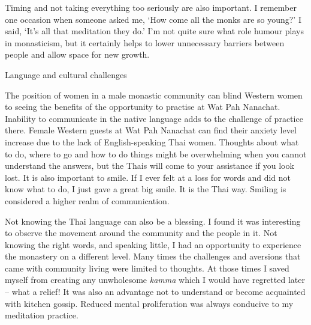Timing and not taking everything too seriously are also important. I
remember one occasion when someone asked me, `How come all the monks are
so young?' I said, `It's all that meditation they do.' I'm not quite
sure what role humour plays in monasticism, but it certainly helps to
lower unnecessary barriers between people and allow space for new
growth.

Language and cultural challenges

The position of women in a male monastic community can blind Western
women to seeing the benefits of the opportunity to practise at Wat Pah
Nanachat. Inability to communicate in the native language adds to the
challenge of practice there. Female Western guests at Wat Pah Nanachat
can find their anxiety level increase due to the lack of
English-speaking Thai women. Thoughts about what to do, where to go and
how to do things might be overwhelming when you cannot understand the
answers, but the Thais will come to your assistance if you look lost. It
is also important to smile. If I ever felt at a loss for words and did
not know what to do, I just gave a great big smile. It is the Thai way.
Smiling is considered a higher realm of communication.

Not knowing the Thai language can also be a blessing. I found it was
interesting to observe the movement around the community and the people
in it. Not knowing the right words, and speaking little, I had an
opportunity to experience the monastery on a different level. Many times
the challenges and aversions that came with community living were
limited to thoughts. At those times I saved myself from creating any
unwholesome \emph{kamma} which I would have regretted later -- what a
relief! It was also an advantage not to understand or become acquainted
with kitchen gossip. Reduced mental proliferation was always conducive
to my meditation practice.

